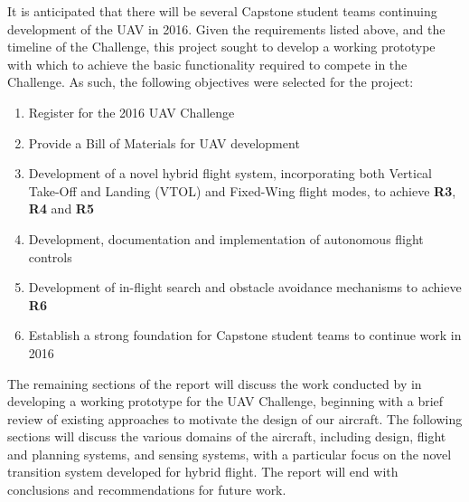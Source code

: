It is anticipated that there will be several Capstone student teams continuing development of the UAV in 2016. Given the requirements listed above, and the timeline of the Challenge, this project sought to develop a working prototype with which to achieve the basic functionality required to compete in the Challenge. As such, the following objectives were selected for the project:
\begin{enumerate}[label=\bfseries O\arabic*:] \itemsep-2pt
	\item Register for the 2016 UAV Challenge
	\item Provide a Bill of Materials for UAV development
	\item Development of a novel hybrid flight system, incorporating both Vertical Take-Off and Landing (VTOL) and Fixed-Wing flight modes, to achieve \textbf{R3}, \textbf{R4} and \textbf{R5}
	\item Development, documentation and implementation of autonomous flight controls
	\item Development of in-flight search and obstacle avoidance mechanisms to achieve \textbf{R6}
	\item Establish a strong foundation for Capstone student teams to continue work in 2016
\end{enumerate}

The remaining sections of the report will discuss the work conducted by \ID in developing a working prototype for the UAV Challenge, beginning with a brief review of existing approaches to motivate the design of our aircraft. The following sections will discuss the various domains of the aircraft, including design, flight and planning systems, and sensing systems, with a particular focus on the novel transition system developed for hybrid flight. The report will end with conclusions and recommendations for future work.